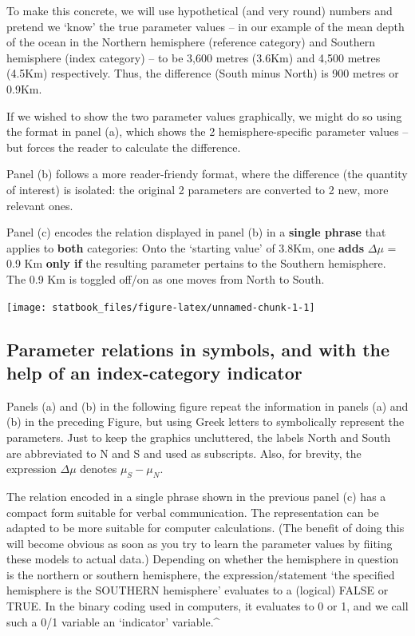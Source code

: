 \documentclass[]{book}
\begin{document}
To make this concrete, we will use hypothetical (and very round) numbers and pretend we `know' the true parameter values -- in our example
of the mean depth of the ocean in the Northern hemisphere (reference category) and Southern hemisphere (index category) -- to be 3,600 metres (3.6Km) and 4,500 metres (4.5Km) respectively. Thus, the difference (South minus North) is 900 metres or 0.9Km.

If we wished to show the two parameter values graphically, we might do so using the format in panel (a), which shows the 2 hemisphere-specific parameter values -- but forces the reader to calculate the difference.

Panel (b) follows a more reader-friendy format, where the difference (the quantity of interest) is isolated: the original 2 parameters are converted to 2 new, more relevant ones.

Panel (c) encodes the relation displayed in panel (b) in a \textbf{single phrase} that applies to \textbf{both} categories: Onto the `starting value' of 3.8Km, one \textbf{adds} \(\Delta \mu\) = 0.9 Km \textbf{only if} the resulting parameter pertains to the Southern hemisphere. The 0.9 Km is toggled off/on as one moves from North to South.

\begin{center}\texttt{[image: statbook\_files/figure-latex/unnamed-chunk-1-1]} \end{center}

\hypertarget{parameter-relations-in-symbols-and-with-the-help-of-an-index-category-indicator}{%
\subsection{Parameter relations in symbols, and with the help of an index-category indicator}\label{parameter-relations-in-symbols-and-with-the-help-of-an-index-category-indicator}}

Panels (a) and (b) in the following figure repeat the information in panels (a) and (b) in the preceding Figure, but using Greek letters to symbolically represent the parameters. Just to keep the graphics uncluttered, the labels North and South are abbreviated to N and S and used as subscripts. Also, for brevity, the expression \(\Delta \mu\) denotes \(\mu_S - \mu_N\).

The relation encoded in a single phrase shown in the previous panel (c) has a compact form suitable for verbal communication. The representation can be adapted to be more suitable for computer calculations. (The benefit of doing this will become obvious as soon as you try to learn the parameter values by fiiting these models to actual data.) Depending on whether the hemisphere in question is the northern or southern hemisphere, the expression/statement `the specified hemisphere is the SOUTHERN hemisphere' evaluates to a (logical) FALSE or TRUE. In the binary coding used in computers, it evaluates to 0 or 1, and we call such a 0/1 variable an `indicator' variable.\^{}
\end{document}

